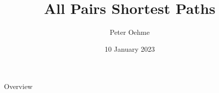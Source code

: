 

\author{Peter Oehme}
\title{All Pairs Shortest Paths}
\date{10 January 2023}




\begin{frame}
    \maketitle
\end{frame}

\begin{frame}{Overview}
    \tableofcontents
\end{frame}







